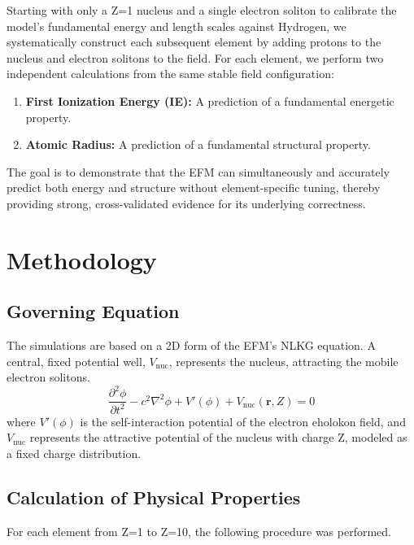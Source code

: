\documentclass[11pt]{article}
\begin{document}
Starting with only a Z=1 nucleus and a single electron soliton to calibrate the model's fundamental energy and length scales against Hydrogen, we systematically construct each subsequent element by adding protons to the nucleus and electron solitons to the field. For each element, we perform two independent calculations from the same stable field configuration:
\begin{enumerate}
    \item \textbf{First Ionization Energy (IE):} A prediction of a fundamental energetic property.
    \item \textbf{Atomic Radius:} A prediction of a fundamental structural property.
\end{enumerate}
The goal is to demonstrate that the EFM can simultaneously and accurately predict both energy and structure without element-specific tuning, thereby providing strong, cross-validated evidence for its underlying correctness.

\section{Methodology}
\subsection{Governing Equation}
The simulations are based on a 2D form of the EFM's NLKG equation. A central, fixed potential well, \(V_{\text{nuc}}\), represents the nucleus, attracting the mobile electron solitons.
\begin{equation}
\frac{\partial^2 \phi}{\partial t^2} - c^2 \nabla^2 \phi + V'(\phi) + V_{\text{nuc}}(\mathbf{r}, Z) = 0
\end{equation}
where \(V'(\phi)\) is the self-interaction potential of the electron eholokon field, and \(V_{\text{nuc}}\) represents the attractive potential of the nucleus with charge Z, modeled as a fixed charge distribution.

\subsection{Calculation of Physical Properties}
For each element from Z=1 to Z=10, the following procedure was performed.
\end{document}
